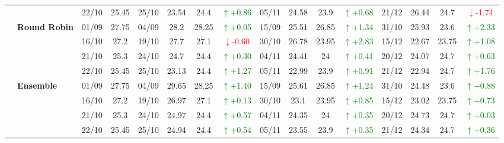 {\begin{longtable}{llcc|cccc|cccc|cccc}
&
& 22/10 & 25.45 & 25/10 & 23.54 & 24.4 & \textcolor{green}{\(\uparrow\)+0.86} & 05/11 & 24.58 & 23.9 & \textcolor{green}{\(\uparrow\)+0.68} & 21/12 & 26.44 & 24.7 & \textcolor{red}{\(\downarrow\)-1.74} \\
\cmidrule(lr){2-16}


& \textbf{Round Robin}
& 01/09 & 27.75 & 04/09 & 28.2 & 28.25 & \textcolor{green}{\(\uparrow\)+0.05} & 15/09 & 25.51 & 26.85 & \textcolor{green}{\(\uparrow\)+1.34} & 31/10 & 25.93 & 23.6 & \textcolor{green}{\(\uparrow\)+2.33} \\

&
& 16/10 & 27.2 & 19/10 & 27.7 & 27.1 & \textcolor{red}{\(\downarrow\)-0.60} & 30/10 & 26.78 & 23.95 & \textcolor{green}{\(\uparrow\)+2.83} & 15/12 & 22.67 & 23.75 & \textcolor{green}{\(\uparrow\)+1.08} \\

&
& 21/10 & 25.3 & 24/10 & 24.7 & 24.4 & \textcolor{green}{\(\uparrow\)+0.30} & 04/11 & 24.41 & 24 & \textcolor{green}{\(\uparrow\)+0.41} & 20/12 & 24.07 & 24.7 & \textcolor{green}{\(\uparrow\)+0.63} \\

&
& 22/10 & 25.45 & 25/10 & 23.13 & 24.4 & \textcolor{green}{\(\uparrow\)+1.27} & 05/11 & 22.99 & 23.9 & \textcolor{green}{\(\uparrow\)+0.91} & 21/12 & 22.94 & 24.7 & \textcolor{green}{\(\uparrow\)+1.76} \\
\cmidrule(lr){2-16}



& \textbf{Ensemble}
& 01/09 & 27.75 & 04/09 & 29.65 & 28.25 & \textcolor{green}{\(\uparrow\)+1.40} & 15/09 & 25.61 & 26.85 & \textcolor{green}{\(\uparrow\)+1.24} & 31/10 & 24.48 & 23.6 & \textcolor{green}{\(\uparrow\)+0.88} \\

&
& 16/10 & 27.2 & 19/10 & 26.97 & 27.1 & \textcolor{green}{\(\uparrow\)+0.13} & 30/10 & 23.1 & 23.95 & \textcolor{green}{\(\uparrow\)+0.85} & 15/12 & 23.02 & 23.75 & \textcolor{green}{\(\uparrow\)+0.73} \\

&
& 21/10 & 25.3 & 24/10 & 24.97 & 24.4 & \textcolor{green}{\(\uparrow\)+0.57} & 04/11 & 24.35 & 24 & \textcolor{green}{\(\uparrow\)+0.35} & 20/12 & 24.73 & 24.7 & \textcolor{green}{\(\uparrow\)+0.03} \\

&
& 22/10 & 25.45 & 25/10 & 24.94 & 24.4 & \textcolor{green}{\(\uparrow\)+0.54} & 05/11 & 23.55 & 23.9 & \textcolor{green}{\(\uparrow\)+0.35} & 21/12 & 24.34 & 24.7 & \textcolor{green}{\(\uparrow\)+0.36} \\

\bottomrule
\end{longtable}
}

